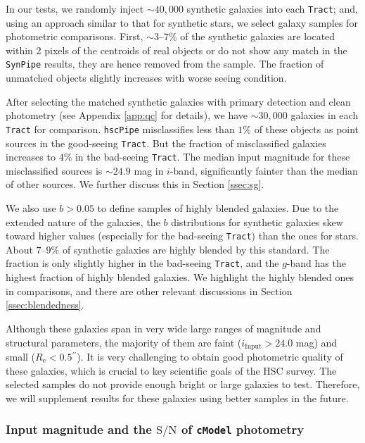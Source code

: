 \documentclass[useamsfonts]{pasj01}
\def\asec{$^{\prime\prime}$}
\def\hscpipe{\texttt{hscPipe}}
\def\synpipe{\texttt{SynPipe}}
\def\cmodel{\texttt{cModel}}
\def\tract{\texttt{Tract}}
\def\s2n{{$\mathrm{S}/\mathrm{N}$}}
\begin{document}
    In our tests, we randomly inject ${\sim}40,000$ synthetic galaxies into each
    \tract{}; and, using an approach similar to that for synthetic stars, we select 
    galaxy samples for photometric comparisons.
    First, ${\sim}3$--$7$\% of the synthetic galaxies are located within 2 pixels 
    of the centroids of real objects or do not show any match in the \synpipe{} 
    results, they are hence removed from the sample.
    The fraction of unmatched objects slightly increases with worse seeing condition.

    After selecting the matched synthetic galaxies with primary detection and
    clean photometry (see Appendix \ref{app:qc} for details), we have ${\sim}30,000$
    galaxies in each \tract{} for comparison.
    \hscpipe{} misclassifies less than $1$\% of these objects as point sources
    in the good-seeing \tract{}.
    But the fraction of misclassified galaxies increases to $4$\% in the
    bad-seeing \tract{}.
    The median input magnitude for these misclassified sources is ${\sim}24.9$ mag
    in $i$-band, significantly fainter than the median of other sources.
    We further discuss this in Section \ref{ssec:sg}.

    We also use $b>0.05$ to define samples of highly blended galaxies.
    Due to the extended nature of the galaxies, the $b$ distributions for synthetic 
    galaxies skew toward higher values (especially for the bad-seeing \tract{}) than
    the ones for stars.
    About $7$--$9$\% of synthetic galaxies are highly blended by this standard.
    The fraction is only slightly higher in the bad-seeing \tract{}, and the
    $g$-band has the highest fraction of highly blended galaxies.
    We highlight the highly blended ones in comparisons, and there are other relevant
    discussions in Section \ref{ssec:blendedness}.

    Although these galaxies span in very wide large ranges of magnitude and
    structural parameters, the majority of them are faint
    ($i_{\mathrm{Input}} > 24.0$ mag) and small ($R_{\mathrm{e}} < 0.5$\asec).
    It is very challenging to obtain good photometric quality of these galaxies, which 
    is crucial to key scientific goals of the HSC survey.
    The selected samples do not provide enough bright or large galaxies to test.
    Therefore, we will supplement results for these galaxies using better samples
    in the future.

\subsubsection{Input magnitude and the \s2n{} of \cmodel{} photometry}
\end{document}
